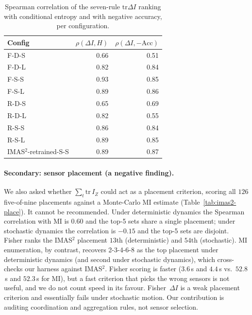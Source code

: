 \documentclass[11pt,a4paper]{article}
\begin{document}
\begin{table}[t]
\centering
\caption{Spearman correlation of the seven-rule $\mathrm{tr}\Delta I$ ranking with conditional entropy and with negative accuracy, per configuration.}
\label{tab:imas2-spearman}
\begin{tabular}{lrr}
\toprule
Config & $\rho(\Delta I,H)$ & $\rho(\Delta I,-\mathrm{Acc})$ \\
\midrule
F-D-S & 0.66 & 0.51 \\
F-D-L & 0.82 & 0.84 \\
F-S-S & 0.93 & 0.85 \\
F-S-L & 0.89 & 0.86 \\
R-D-S & 0.65 & 0.69 \\
R-D-L & 0.82 & 0.55 \\
R-S-S & 0.86 & 0.84 \\
R-S-L & 0.89 & 0.85 \\
IMAS$^2$-retrained-S-S & 0.89 & 0.87 \\
\bottomrule
\end{tabular}
\end{table}

\paragraph{Secondary: sensor placement (a negative finding).}
We also asked whether $\sum_t\mathrm{tr}\,I_Z$ could act as a placement
criterion, scoring all $126$ five-of-nine placements against a Monte-Carlo
MI estimate (Table~\ref{tab:imas2-place}). It cannot be recommended. Under
deterministic dynamics the Spearman correlation with MI is $0.60$ and the
top-5 sets share a single placement; under stochastic dynamics the
correlation is $-0.15$ and the top-5 sets are disjoint. Fisher ranks
the IMAS$^2$ placement $13$th (deterministic) and $54$th (stochastic). MI
enumeration, by contrast, recovers 2-3-4-6-8 as the top placement under
deterministic dynamics (and second under stochastic dynamics), which
cross-checks our harness against IMAS$^2$. Fisher scoring is faster
($3.6$\,s and $4.4$\,s vs.\ $52.8$\,s and $52.3$\,s for MI), but a fast
criterion that picks the wrong sensors is not useful, and we do not count
speed in its favour. Fisher~$\Delta I$ is a weak placement criterion and
essentially fails under stochastic motion. Our contribution is auditing
coordination and aggregation rules, not sensor selection.
\end{document}
